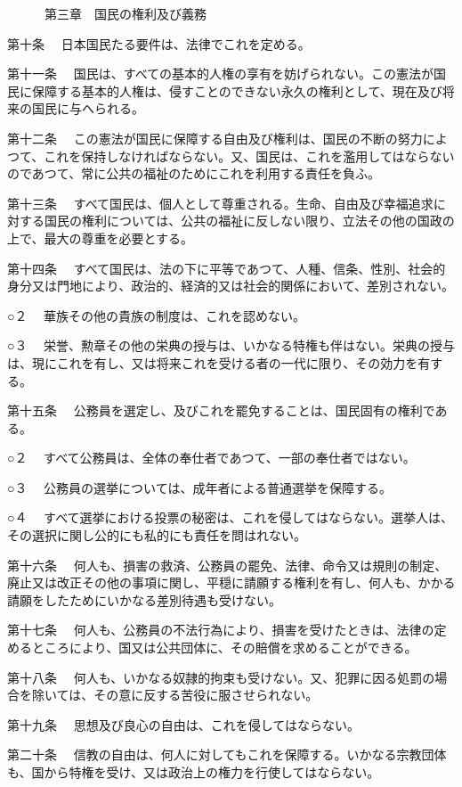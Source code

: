 　　　第三章　国民の権利及び義務

第十条 　日本国民たる要件は、法律でこれを定める。

第十一条 　国民は、すべての基本的人権の享有を妨げられない。この憲法が国民に保障する基本的人権は、侵すことのできない永久の権利として、現在及び将来の国民に与へられる。

第十二条 　この憲法が国民に保障する自由及び権利は、国民の不断の努力によつて、これを保持しなければならない。又、国民は、これを濫用してはならないのであつて、常に公共の福祉のためにこれを利用する責任を負ふ。

第十三条 　すべて国民は、個人として尊重される。生命、自由及び幸福追求に対する国民の権利については、公共の福祉に反しない限り、立法その他の国政の上で、最大の尊重を必要とする。

第十四条 　すべて国民は、法の下に平等であつて、人種、信条、性別、社会的身分又は門地により、政治的、経済的又は社会的関係において、差別されない。

○２ 　華族その他の貴族の制度は、これを認めない。

○３ 　栄誉、勲章その他の栄典の授与は、いかなる特権も伴はない。栄典の授与は、現にこれを有し、又は将来これを受ける者の一代に限り、その効力を有する。

第十五条 　公務員を選定し、及びこれを罷免することは、国民固有の権利である。

○２ 　すべて公務員は、全体の奉仕者であつて、一部の奉仕者ではない。

○３ 　公務員の選挙については、成年者による普通選挙を保障する。

○４ 　すべて選挙における投票の秘密は、これを侵してはならない。選挙人は、その選択に関し公的にも私的にも責任を問はれない。

第十六条 　何人も、損害の救済、公務員の罷免、法律、命令又は規則の制定、廃止又は改正その他の事項に関し、平穏に請願する権利を有し、何人も、かかる請願をしたためにいかなる差別待遇も受けない。

第十七条 　何人も、公務員の不法行為により、損害を受けたときは、法律の定めるところにより、国又は公共団体に、その賠償を求めることができる。

第十八条 　何人も、いかなる奴隷的拘束も受けない。又、犯罪に因る処罰の場合を除いては、その意に反する苦役に服させられない。

第十九条 　思想及び良心の自由は、これを侵してはならない。

第二十条 　信教の自由は、何人に対してもこれを保障する。いかなる宗教団体も、国から特権を受け、又は政治上の権力を行使してはならない。

